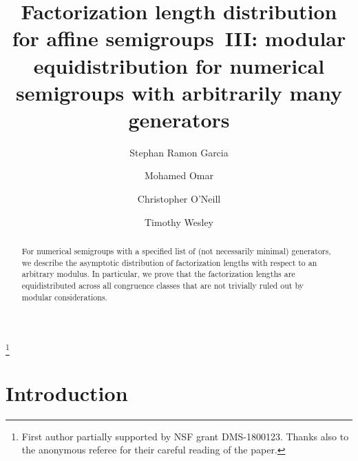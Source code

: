 \documentclass[10pt,reqno]{amsart}
\newcommand{\0}{\color{lightgray}0}
\renewcommand\>{\rangle}
\newcommand\<{\langle}
\theoremstyle{plain}
\theoremstyle{definition}
\begin{document}
\title[Factorization length distribution for affine semigroups III]{Factorization length distribution for affine semigroups~III: modular equidistribution for numerical semigroups with arbitrarily many generators}

\author[S.~Garcia]{Stephan Ramon Garcia}
\address{Department of Mathematics, Pomona College, 610 N. College Ave., Claremont, CA 91711} 

\author[M.~Omar]{Mohamed Omar}
\address{Department of Mathematics, Harvey Mudd College, 301 Platt Blvd., Claremont, CA 91711}

\author[C.~O'Neill]{Christopher O'Neill}
\address{Mathematics Department, San Diego State University, San Diego, CA 92182}

\author[T.~Wesley]{Timothy Wesley}
\address{Pomona College, Claremont, CA}


\thanks{First author partially supported by NSF grant DMS-1800123. Thanks also to the anonymous referee for their careful reading of the paper.}




\begin{abstract}
For numerical semigroups with a specified list of (not necessarily minimal) generators, we describe the asymptotic distribution of factorization lengths with respect to an arbitrary modulus.  In particular, we prove that the factorization lengths are equidistributed across all congruence classes that are not trivially ruled out by modular considerations.
\end{abstract}


\maketitle


\section{Introduction}\label{sec:intro}
\end{document}
